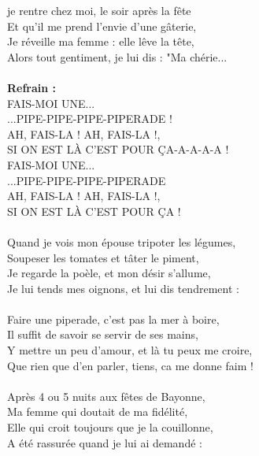 
 je rentre chez moi, le soir après la fête
\\Et qu'il me prend l'envie d'une gâterie,
\\Je réveille ma femme : elle lêve la tête,
\\Alors tout gentiment, je lui dis : "Ma chérie...
\\\\\textbf{Refrain :}
\\FAIS-MOI UNE...
\\...PIPE-PIPE-PIPE-PIPERADE !
\\AH, FAIS-LA ! AH, FAIS-LA !,
\\SI ON EST LÀ C'EST POUR ÇA-A-A-A-A !
\\FAIS-MOI UNE...
\\...PIPE-PIPE-PIPE-PIPERADE
\\AH, FAIS-LA ! AH, FAIS-LA !,
\\SI ON EST LÀ C'EST POUR ÇA ! ~~~~~~~~~~~~~~~~~~\bissimple
\\\\Quand je vois mon épouse tripoter les légumes,
\\Soupeser les tomates et tâter le piment,
\\Je regarde la poèle, et mon désir s'allume,
\\Je lui tends mes oignons, et lui dis tendrement :
\\\\Faire une piperade, c'est pas la mer à boire,
\\Il suffit de savoir se servir de ses mains,
\\Y mettre un peu d'amour, et là tu peux me croire,
\\Que rien que d'en parler, tiens, ca me donne faim !
\\\\Après 4 ou 5 nuits aux fêtes de Bayonne,
\\Ma femme qui doutait de ma fidélité,
\\Elle qui croit toujours que je la couillonne,
\\A été rassurée quand je lui ai demandé :

\breakpage